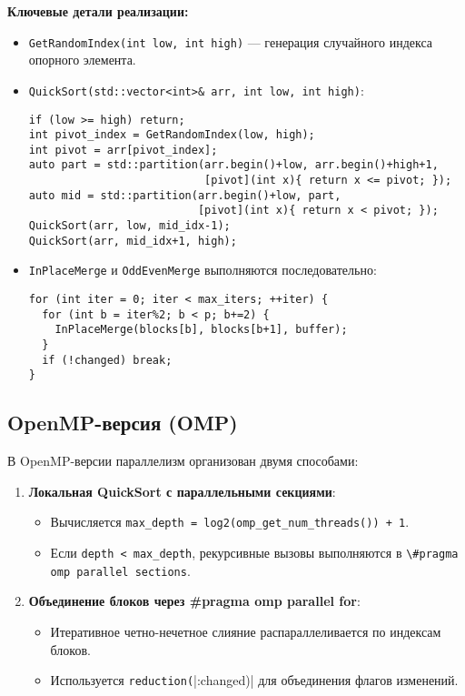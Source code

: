\documentclass[12pt]{article}
\begin{document}
\noindent\textbf{Ключевые детали реализации:}
\begin{itemize}
    \item \texttt{GetRandomIndex(int low, int high)} — генерация случайного индекса опорного элемента.
    \item \texttt{QuickSort(std::vector<int>\& arr, int low, int high)}:
    \begin{lstlisting}
if (low >= high) return;
int pivot_index = GetRandomIndex(low, high);
int pivot = arr[pivot_index];
auto part = std::partition(arr.begin()+low, arr.begin()+high+1,
                           [pivot](int x){ return x <= pivot; });
auto mid = std::partition(arr.begin()+low, part,
                          [pivot](int x){ return x < pivot; });
QuickSort(arr, low, mid_idx-1);
QuickSort(arr, mid_idx+1, high);
    \end{lstlisting}
    \item \texttt{InPlaceMerge} и \texttt{OddEvenMerge} выполняются последовательно:
    \begin{lstlisting}
for (int iter = 0; iter < max_iters; ++iter) {
  for (int b = iter%2; b < p; b+=2) {
    InPlaceMerge(blocks[b], blocks[b+1], buffer);
  }
  if (!changed) break;
}
    \end{lstlisting}
\end{itemize}

\subsection{OpenMP-версия (OMP)}
\hspace*{1.25em}В OpenMP-версии параллелизм организован двумя способами:
\begin{enumerate}
    \item \textbf{Локальная QuickSort с параллельными секциями}:
    \begin{itemize}
        \item Вычисляется \verb|max_depth = log2(omp_get_num_threads()) + 1|.
        \item Если \verb|depth < max_depth|, рекурсивные вызовы выполняются в \verb|\#pragma omp parallel sections|.
    \end{itemize}
    \item \textbf{Объединение блоков через \#pragma omp parallel for}:
    \begin{itemize}
        \item Итеративное четно-нечетное слияние распараллеливается по индексам блоков.
        \item Используется \verb|reduction(||:changed)| для объединения флагов изменений.
    \end{itemize}
\end{enumerate}
\end{document}
